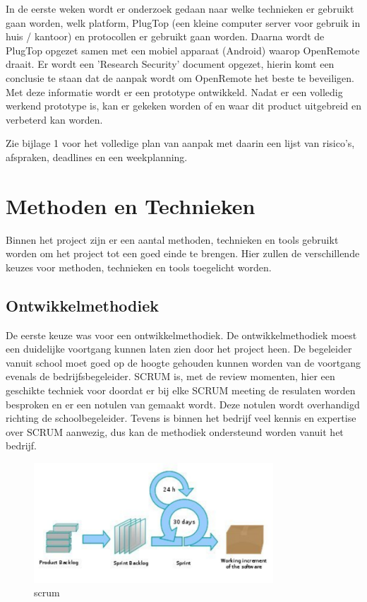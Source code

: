 \documentclass[]{article}
\begin{document}
In de eerste weken wordt  er  onderzoek  gedaan  naar  welke  technieken  er
gebruikt gaan worden, welk platform,  PlugTop (een kleine computer server voor gebruik in huis / kantoor)  en  protocollen  er  gebruikt
gaan worden. Daarna wordt de PlugTop opgezet samen met een  mobiel  apparaat
(Android)  waarop  OpenRemote  draait. Er wordt een 'Research  Security'
document opgezet, hierin komt een conclusie te staan dat de aanpak wordt  om
OpenRemote het beste  te  beveiligen.  Met  deze  informatie  wordt  er  een
prototype ontwikkeld. Nadat er een volledig werkend  prototype  is,  kan  er
gekeken worden of en waar dit product uitgebreid en verbeterd kan worden.

Zie bijlage 1 voor het volledige plan van aanpak met daarin een lijst  van
risico's,  afspraken,  deadlines  en  een weekplanning.

\newpage
\section{Methoden en Technieken}

Binnen het project zijn er een aantal methoden, technieken en tools
gebruikt worden om het project tot een goed einde te brengen. Hier zullen de
verschillende keuzes voor methoden, technieken en tools toegelicht worden.

\subsection{Ontwikkelmethodiek}
De eerste keuze was voor een ontwikkelmethodiek. De ontwikkelmethodiek
moest een duidelijke voortgang kunnen laten zien door het project heen. De
begeleider vanuit school moet goed op de hoogte gehouden kunnen worden van
de voortgang evenals de bedrijfsbegeleider. SCRUM is, met de review
momenten, hier een geschikte techniek voor doordat er bij elke SCRUM meeting de
resulaten worden besproken en er een notulen van gemaakt wordt. Deze notulen wordt
overhandigd richting de schoolbegeleider. Tevens is binnen het bedrijf veel
kennis en expertise over SCRUM aanwezig, dus kan de methodiek ondersteund worden
vanuit het bedrijf.

\begin{figure}[htpb]
  \begin{center}
    \includegraphics[width=0.80\textwidth]{scrum.pdf}
  \end{center}
  \caption{scrum}
\end{figure}
\end{document}
